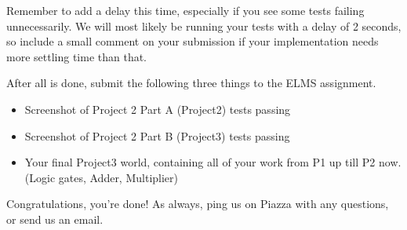 \documentclass{article}
\begin{document}
Remember to add a delay this time, especially if you see some tests failing unnecessarily. We will most likely be running your tests with a delay of 2 seconds, so include a small comment on your submission if your implementation needs more settling time than that.

After all is done, submit the following three things to the ELMS assignment.

\begin{itemize}
  \item Screenshot of Project 2 Part A (Project2) tests passing
  \item Screenshot of Project 2 Part B (Project3) tests passing
  \item Your final Project3 world, containing all of your work from P1 up till P2 now. (Logic gates, Adder, Multiplier)
\end{itemize}

Congratulations, you're done! As always, ping us on Piazza with any questions, or send us an email.
\end{document}
